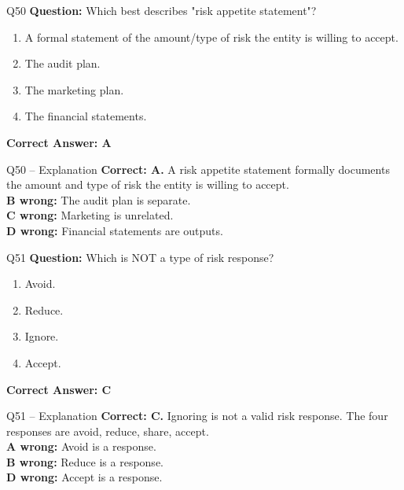 \documentclass[aspectratio=169,10pt]{beamer}
\begin{document}
	\begin{frame}[t]{Q50}
		\small
		\textbf{Question:} Which best describes "risk appetite statement"?
		\begin{enumerate}[label=\Alph*.,itemsep=1pt,topsep=2pt]
			\item A formal statement of the amount/type of risk the entity is willing to accept.
			\item The audit plan.
			\item The marketing plan.
			\item The financial statements.
		\end{enumerate}
		\vspace{4pt}
		\textbf{Correct Answer: A}
	\end{frame}
	
	\begin{frame}[t]{Q50 -- Explanation}
		\small
		\textbf{Correct: A.} A risk appetite statement formally documents the amount and type of risk the entity is willing to accept. \\[4pt]
		\textbf{B wrong:} The audit plan is separate. \\[2pt]
		\textbf{C wrong:} Marketing is unrelated. \\[2pt]
		\textbf{D wrong:} Financial statements are outputs.
	\end{frame}
	
	\begin{frame}[t]{Q51}
		\small
		\textbf{Question:} Which is NOT a type of risk response?
		\begin{enumerate}[label=\Alph*.,itemsep=1pt,topsep=2pt]
			\item Avoid.
			\item Reduce.
			\item Ignore.
			\item Accept.
		\end{enumerate}
		\vspace{4pt}
		\textbf{Correct Answer: C}
	\end{frame}
	
	\begin{frame}[t]{Q51 -- Explanation}
		\small
		\textbf{Correct: C.} Ignoring is not a valid risk response. The four responses are avoid, reduce, share, accept. \\[4pt]
		\textbf{A wrong:} Avoid is a response. \\[2pt]
		\textbf{B wrong:} Reduce is a response. \\[2pt]
		\textbf{D wrong:} Accept is a response.
	\end{frame}
	
\end{document}
